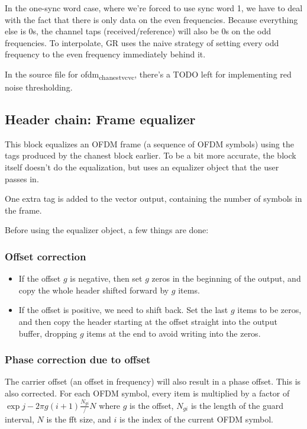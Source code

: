 \documentclass[11pt]{article}
\begin{document}
In the one-sync word case, where we're forced to use sync word 1, we
have to deal with the fact that there is only data on the even
frequencies. Because everything else is 0s, the channel taps
(received/reference) will also be 0s on the odd frequencies. To
interpolate, GR uses the naive strategy of setting every odd frequency
to the even frequency immediately behind it.

In the source file for ofdm\textsubscript{chanest}\textsubscript{vcvc}, there's a TODO left for
implementing red noise thresholding.
\subsection{Header chain: Frame equalizer}
\label{sec:org8eb8388}
This block equalizes an OFDM frame (a sequence of OFDM symbols) using
the tags produced by the chanest block earlier. To be a bit more
accurate, the block itself doesn't do the equalization, but uses an
equalizer object that the user passes in.

One extra tag is added to the vector output, containing the number of
symbols in the frame.

Before using the equalizer object, a few things are done:
\subsubsection{Offset correction}
\label{sec:org4c6ec8c}
\begin{itemize}
\item If the offset \(g\) is negative, then set \(g\) zeros in the beginning
of the output, and copy the whole header shifted forward by \(g\)
items.
\item If the offset is positive, we need to shift back. Set the last \(g\)
items to be zeros, and then copy the header starting at the offset
straight into the output buffer, dropping \(g\) items at the end to
avoid writing into the zeros.
\end{itemize}
\subsubsection{Phase correction due to offset}
\label{sec:orgb431808}
The carrier offset (an offset in frequency) will also result in a
phase offset. This is also corrected. For each OFDM symbol, every item
is multiplied by a factor of \(\exp{j-2\pi g (i + 1) \frac{N_{gi}}/{N}}\)
where \(g\) is the offset, \(N_{gi}\) is the length of the guard interval,
\(N\) is the fft size, and \(i\) is the index of the current OFDM symbol.
\end{document}

